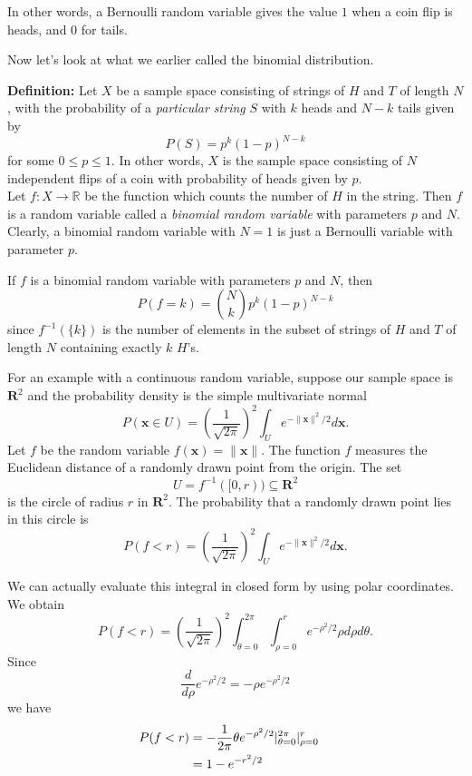\documentclass[
]{article}
\begin{document}
In other words, a Bernoulli random variable gives the value \(1\) when a
coin flip is heads, and \(0\) for tails.

Now let's look at what we earlier called the binomial distribution.

\textbf{Definition:} Let \(X\) be a sample space consisting of strings
of \(H\) and \(T\) of length \(N\), with the probability of a
\emph{particular string} \(S\) with \(k\) heads and \(N-k\) tails given
by \[
P(S)=p^{k}(1-p)^{N-k}
\] for some \(0\le p\le 1\). In other words, \(X\) is the sample space
consisting of \(N\) independent flips of a coin with probability of
heads given by \(p\).\\
Let \(f:X\to \mathbb{R}\) be the function which counts the number of
\(H\) in the string. Then \(f\) is a random variable called a
\emph{binomial random variable} with parameters \(p\) and \(N\).
Clearly, a binomial random variable with \(N=1\) is just a Bernoulli
variable with parameter \(p\).

If \(f\) is a binomial random variable with parameters \(p\) and \(N\),
then \[
P(f=k) = \binom{N}{k}p^{k}(1-p)^{N-k}
\] since \(f^{-1}(\{k\})\) is the number of elements in the subset of
strings of \(H\) and \(T\) of length \(N\) containing exactly \(k\)
\(H\)'s.

For an example with a continuous random variable, suppose our sample
space is \(\mathbf{R}^{2}\) and the probability density is the simple
multivariate normal \[
P(\mathbf{x}\in U) = \left(\frac{1}{\sqrt{2\pi}}\right)^2\int_{U} e^{-\|\mathbf{x}\|^2/2} d\mathbf{x}.
\] Let \(f\) be the random variable \(f(\mathbf{x})=\|\mathbf{x}\|\).
The function \(f\) measures the Euclidean distance of a randomly drawn
point from the origin. The set
\[U=f^{-1}([0,r))\subseteq\mathbf{R}^{2}\] is the circle of radius \(r\)
in \(\mathbf{R}^{2}\). The probability that a randomly drawn point lies
in this circle is \[
P(f<r) = \left(\frac{1}{\sqrt{2\pi}}\right)^2\int_{U} e^{-\|\mathbf{x}\|^2/2} d\mathbf{x}.
\]

We can actually evaluate this integral in closed form by using polar
coordinates. We obtain \[
P(f<r) = \left(\frac{1}{\sqrt{2\pi}}\right)^2\int_{\theta=0}^{2\pi}\int_{\rho=0}^{r} e^{-\rho^2/2}\rho d\rho d\theta.
\] Since \[
\frac{d}{d\rho}e^{-\rho^2/2}=-\rho e^{-\rho^2/2}
\] we have \begin{align*}
P(f<r)&=-\frac{1}{2\pi}\theta e^{-\rho^2/2}|_{\theta=0}^{2\pi}|_{\rho=0}^{r}\cr
&=1-e^{-r^2/2}\cr
\end{align*}
\end{document}
